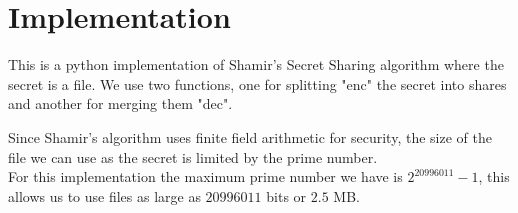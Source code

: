 \documentclass[fleqn,12pt,a4paper]{article}
\begin{document}
\section{Implementation}

This is a python implementation of Shamir's Secret Sharing algorithm where the secret is a file. We use two functions, one for splitting "enc" the secret into shares and another for merging them "dec".
\vspace{5mm}

Since Shamir's algorithm uses finite field arithmetic for security, the size of the file we can use as the secret is limited by the prime number. \\
For this implementation the maximum prime number we have is  $\displaystyle{2^{20996011} - 1}$, this allows us to use files as large as $\displaystyle{20996011}$ bits or $\displaystyle{2.5}$ MB.


\newpage
\end{document}
